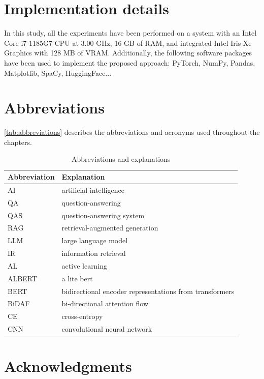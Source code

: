 \documentclass[a4paper,12pt, openany]{book}  %
\begin{document}
\clearpage
\begin{appendices}
    \chapter{Implementation details}
    \label{appendix:A}

In this study, all the experiments have been performed on a system with an Intel Core i7-1185G7 CPU at 3.00 GHz, 16 GB of RAM, and integrated Intel Iris Xe Graphics with 128 MB of VRAM. Additionally, the following software packages have been used to implement the proposed approach: PyTorch, NumPy, Pandas, Matplotlib, SpaCy, HuggingFace...

    \chapter{Abbreviations}
    \label{appendix:B}
    \autoref{tab:abbreviations} describes the abbreviations and acronyms used throughout the chapters.

\begin{table}[H]
\begin{flushright}
\centering
\begin{tabular}{ll}
\toprule
\textbf{Abbreviation} & \textbf{Explanation} \\ 
\midrule
AI & artificial intelligence\\
QA & question-answering\\
QAS & question-answering system\\
RAG & retrieval-augmented generation\\
LLM & large language model\\
IR & information retrieval\\

AL        & active learning \\[0.2em]
ALBERT    & a lite bert \\[0.2em]
BERT      & bidirectional encoder representations from transformers \\[0.2em]
BiDAF     & bi-directional attention flow \\[0.2em]
CE        & cross-entropy \\[0.2em]
CNN       & convolutional neural network \\[0.2em]
\bottomrule
\end{tabular}
\caption{Abbreviations and explanations}
\label{tab:abbreviations}
\end{flushright}
\end{table}

\end{appendices}


\chapter*{Acknowledgments}

\backmatter
\pagestyle{fancy}
\cleardoublepage
{}
{}
\nocite{noauthor_was_nodate}
\printbibliography
\end{document}
